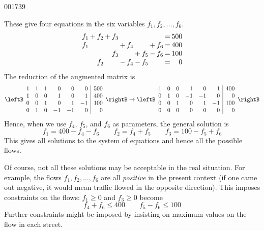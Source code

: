 \begin{example}{}{001739}
\begin{solution}
These give four equations in the six variables $ f_1, f_2, \dots , f_6 $.
\begin{equation*}
\arraycolsep=1pt
\begin{array}{rlrlrlrlrlrcr}
	f_1 & + & f_2 & + & f_3 &   &     &   &     &   &     & = & 500 \\
	f_1 &   &     &   &     & + & f_4 &   &     & + & f_6 & = & 400 \\
	    &   &     &   & f_3 &   &     & + & f_5 & - & f_6 & = & 100 \\
	    &   & f_2 &   &     & - & f_4 & - & f_5 &   &     & = & 0 \\
\end{array}
\end{equation*}
The reduction of the augmented matrix is
\begin{equation*}
\leftB \begin{array}{rrrrrr|r}
	1 & 1 & 1 & 0 & 0 & 0 & 500 \\
	1 & 0 & 0 & 1 & 0 & 1 & 400 \\
	0 & 0 & 1 & 0 & 1 &-1 & 100 \\
	0 & 1 & 0 &-1 &-1 & 0 & 0
\end{array} \rightB
\rightarrow
\leftB \begin{array}{rrrrrr|r}
	1 & 0 & 0 & 1 & 0 & 1 & 400 \\
	0 & 1 & 0 &-1 &-1 & 0 & 0 \\
	0 & 0 & 1 & 0 & 1 &-1 & 100 \\
	0 & 0 & 0 & 0 & 0 & 0 & 0
\end{array} \rightB
\end{equation*}
Hence, when we use $f_4$, $f_5$, and $f_6$ as parameters, the general solution is
\begin{equation*}
f_1 = 400 - f_4 - f_6 \quad\quad f_2 = f_4 + f_5 \quad\quad f_3 = 100 - f_5 + f_6
\end{equation*}
This gives all solutions to the system of equations and hence all the possible flows.

Of course, not all these solutions may be acceptable in the real situation. For example, the flows $ f_1, f_2, \dots , f_6 $ are all \textit{positive} in the present context (if one came out negative, it would mean traffic flowed in the opposite direction). This imposes constraints on the flows: $f_1 \geq 0$ and $f_3 \geq 0$ become
\begin{equation*}
f_4 + f_6 \leq 400 \quad\quad f_5 - f_6 \leq 100
\end{equation*}
Further constraints might be imposed by insisting on maximum values on the flow in each street.
\end{solution}
\end{example}
